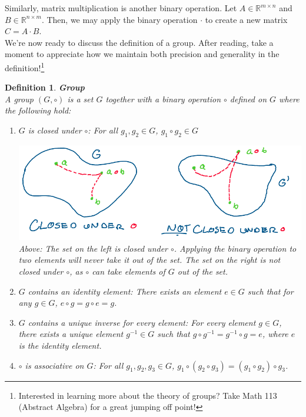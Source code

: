 \documentclass[oneside]{book}
\newtheorem{definition}{Definition}
\newenvironment{defn} %
  {\colorlet{shadecolor}{orange!15}\begin{shaded}\begin{definition}}
  {\end{definition}\end{shaded}}
\begin{document}
Similarly, matrix multiplication is another binary operation. Let $A \in \mathbb{R}^{m\times n}$ and $B \in \mathbb{R}^{n\times m}$. Then, we may apply the binary operation $\cdot$ to create a new matrix $C = A\cdot B$.\\
We're now ready to discuss the definition of a group. After reading, take a moment to appreciate how we maintain both precision and generality in the definition!\footnote{Interested in learning more about the theory of groups? Take Math 113 (Abstract Algebra) for a great jumping off point!}
\begin{defn}
\textbf{Group}\\
A group $(G, \circ)$ is a set $G$ together with a binary operation $\circ$ defined on $G$ where the following hold:
\begin{enumerate}
    \item $G$ is closed under $\circ$: For all $g_1, g_2 \in G$, $g_1 \circ g_2 \in G$
    \begin{center}
        \includegraphics[scale=0.3]{images/closure.png}\\
        \textit{Above: The set on the left is closed under $\circ$. Applying the binary operation to two elements will never take it out of the set. The set on the right is not closed under $\circ$, as $\circ$ can take elements of $G$ out of the set.}
    \end{center}
    \item $G$ contains an identity element: There exists an element $e\in G$ such that for any $g \in G$, $e \circ g = g \circ e = g$.
    \item $G$ contains a unique inverse for every element: For every element $g\in G$, there exists a unique element $g^{-1} \in G$ such that $g\circ g^{-1} = g^{-1} \circ g = e$, where $e$ is the identity element.
    \item $\circ$ is associative on $G$: For all $g_1, g_2, g_3 \in G$, $g_1\circ(g_2\circ g_3) = (g_1\circ g_2)\circ g_3$.
\end{enumerate}
\end{defn}\noindent
\end{document}
